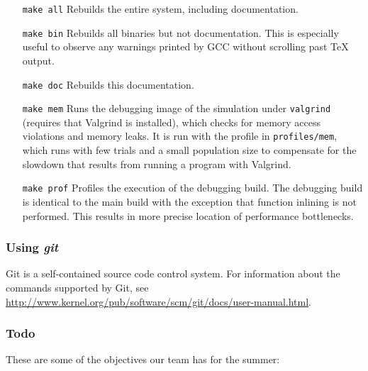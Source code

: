 \documentclass{article}
\begin{document}
        \begin{enumerate}
          \item[\tt make all]
          Rebuilds the entire system, including documentation.

          \item[\tt make bin]
          Rebuilds all binaries but not documentation. This is especially useful
          to observe any warnings printed by GCC without scrolling past \TeX
          output.

          \item[\tt make doc]
          Rebuilds this documentation.

          \item[\tt make mem]
          Runs the debugging image of the simulation under \verb|valgrind|
          (requires that Valgrind is installed), which checks for memory access
          violations and memory leaks. It is run with the profile in
          \verb|profiles/mem|, which runs with few trials and a small population
          size to compensate for the slowdown that results from running a
          program with Valgrind.

          \item[\tt make prof]
          Profiles the execution of the debugging build. The debugging build is
          identical to the main build with the exception that function inlining
          is not performed. This results in more precise location of performance
          bottlenecks.
        \end{enumerate}

      \subsubsection{Using {\em git}}
        \label{sec:git}

        Git is a self-contained source code control system. For information
        about the commands supported by Git, see
        \url{http://www.kernel.org/pub/software/scm/git/docs/user-manual.html}.

      \subsubsection{Todo}
        \label{sec:todo}

        These are some of the objectives our team has for the summer:
\end{document}
